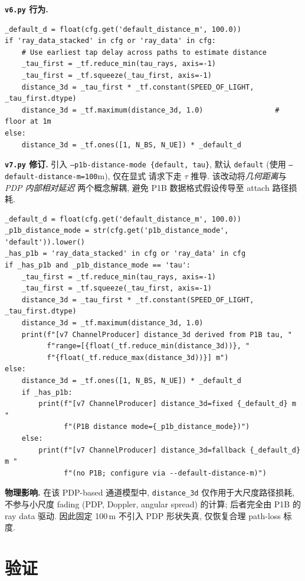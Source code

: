 \documentclass[11pt,a4paper,UTF8,fontset=fandol]{ctexart}
\newcommand{\vsix}{\texttt{v6.py}}
\newcommand{\vseven}{\texttt{v7.py}}
\begin{document}
\textbf{\vsix{} 行为.}
\begin{lstlisting}[caption={v6.py: lines 2004--2017}]
_default_d = float(cfg.get('default_distance_m', 100.0))
if 'ray_data_stacked' in cfg or 'ray_data' in cfg:
    # Use earliest tap delay across paths to estimate distance
    _tau_first = _tf.reduce_min(tau_rays, axis=-1)
    _tau_first = _tf.squeeze(_tau_first, axis=-1)
    distance_3d = _tau_first * _tf.constant(SPEED_OF_LIGHT, _tau_first.dtype)
    distance_3d = _tf.maximum(distance_3d, 1.0)                 # floor at 1m
else:
    distance_3d = _tf.ones([1, N_BS, N_UE]) * _default_d
\end{lstlisting}

\textbf{\vseven{} 修订.} 引入 \texttt{--p1b-distance-mode \{default, tau\}},
默认 \texttt{default} (使用 \texttt{--default-distance-m=100}m), 仅在显式
请求下走 $\tau$ 推导. 该改动将\textit{几何距离}与\textit{PDP 内部相对延迟}
两个概念解耦, 避免 P1B 数据格式假设传导至 attach 路径损耗.

\begin{lstlisting}[caption={v7.py: lines 2051--2070}]
_default_d = float(cfg.get('default_distance_m', 100.0))
_p1b_distance_mode = str(cfg.get('p1b_distance_mode', 'default')).lower()
_has_p1b = 'ray_data_stacked' in cfg or 'ray_data' in cfg
if _has_p1b and _p1b_distance_mode == 'tau':
    _tau_first = _tf.reduce_min(tau_rays, axis=-1)
    _tau_first = _tf.squeeze(_tau_first, axis=-1)
    distance_3d = _tau_first * _tf.constant(SPEED_OF_LIGHT, _tau_first.dtype)
    distance_3d = _tf.maximum(distance_3d, 1.0)
    print(f"[v7 ChannelProducer] distance_3d derived from P1B tau, "
          f"range=[{float(_tf.reduce_min(distance_3d))}, "
          f"{float(_tf.reduce_max(distance_3d))}] m")
else:
    distance_3d = _tf.ones([1, N_BS, N_UE]) * _default_d
    if _has_p1b:
        print(f"[v7 ChannelProducer] distance_3d=fixed {_default_d} m "
              f"(P1B distance mode={_p1b_distance_mode})")
    else:
        print(f"[v7 ChannelProducer] distance_3d=fallback {_default_d} m "
              f"(no P1B; configure via --default-distance-m)")
\end{lstlisting}

\textbf{物理影响.} 在该 PDP-based 通道模型中, \texttt{distance\_3d}
仅作用于大尺度路径损耗, 不参与小尺度 fading (PDP, Doppler, angular spread)
的计算; 后者完全由 P1B 的 ray data 驱动. 因此固定 100\,m 不引入 PDP 形状失真,
仅恢复合理 path-loss 标度.

\section{验证}
\label{sec:verify}
\end{document}
